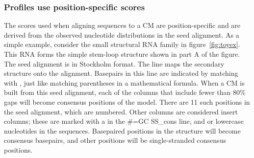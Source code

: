 
\subsubsection{Profiles use position-specific scores}

The scores used when aligning sequences to a CM are position-specific
and are derived from the observed nucleotide distributions in the seed
alignment. As a simple example, consider the small structural RNA
family in figure~\ref{fig:toyex}. This RNA forms the simple stem-loop
structure shown in part A of the figure. The seed alignment is in
Stockholm format. The  line maps the secondary
structure onto the alignment. Basepairs in this line are indicated by
matching \prog{<} with \prog{>}, just like matching parentheses in a mathematical
formula. When a CM is built from this seed alignment, each of the
columns that include fewer than 80\% gaps will become consensus
positions of the model. There are 11 such positions in the seed
alignment, which are numbered. Other columns are considered insert columns;
these are marked with a  in the {\#=GC SS\_cons} line, and
 or lowercase nucleotides in the sequences. Basepaired
positions in the structure will become consensus basepairs, and other
positions will be single-stranded consensus positions. 

